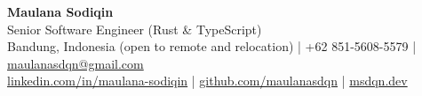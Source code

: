 \begin{center}
    {\Huge\bfseries Maulana Sodiqin} \\
    \vspace{2mm}
    {\large Senior Software Engineer (Rust \& TypeScript)} \\
    \vspace{2mm}
    Bandung, Indonesia (open to remote and relocation) | +62 851-5608-5579 | \href{mailto:maulanasdqn@gmail.com}{maulanasdqn@gmail.com} \\
    \href{https://linkedin.com/in/maulana-sodiqin}{linkedin.com/in/maulana-sodiqin} | \href{https://github.com/maulanasdqn}{github.com/maulanasdqn} | \href{https://msdqn.dev}{msdqn.dev}
\end{center}
